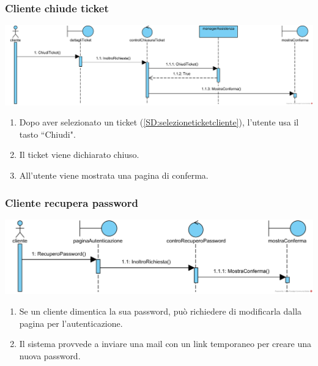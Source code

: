 \documentclass[12pt,a4paper]{article}
\begin{document}
\subsubsection{Cliente chiude ticket}
\label{SD:chiusuraticket}

\begin{center}
\includegraphics[width=\textwidth]{SequenceDiagram/ClienteTicketChiusura}
\end{center}

\begin{enumerate}
\item Dopo aver selezionato un ticket (\ref{SD:selezioneticketcliente}), l'utente usa il tasto ``Chiudi".
\item Il ticket viene dichiarato chiuso.
\item All'utente viene mostrata una pagina di conferma.
\end{enumerate}

\subsubsection{Cliente recupera password}
\label{SD:recuperopw}

\begin{center}
\includegraphics[width=\textwidth]{SequenceDiagram/ClientePasswordRecupero}
\end{center}

\begin{enumerate}
\item Se un cliente dimentica la sua password, può richiedere di modificarla dalla pagina per l'autenticazione.
\item Il sistema provvede a inviare una mail con un link temporaneo per creare una nuova password.
\end{enumerate}
\end{document}
